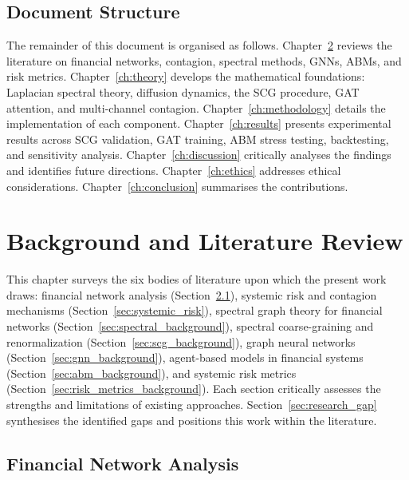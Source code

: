 \section{Document Structure}
\label{sec:structure}

The remainder of this document is organised as follows. Chapter~\ref{ch:background} reviews the literature on financial networks, contagion, spectral methods, GNNs, ABMs, and risk metrics. Chapter~\ref{ch:theory} develops the mathematical foundations: Laplacian spectral theory, diffusion dynamics, the SCG procedure, GAT attention, and multi-channel contagion. Chapter~\ref{ch:methodology} details the implementation of each component. Chapter~\ref{ch:results} presents experimental results across SCG validation, GAT training, ABM stress testing, backtesting, and sensitivity analysis. Chapter~\ref{ch:discussion} critically analyses the findings and identifies future directions. Chapter~\ref{ch:ethics} addresses ethical considerations. Chapter~\ref{ch:conclusion} summarises the contributions.


\chapter{Background and Literature Review}
\label{ch:background}

This chapter surveys the six bodies of literature upon which the present
work draws: financial network analysis (Section~\ref{sec:fin_networks}),
systemic risk and contagion mechanisms
(Section~\ref{sec:systemic_risk}), spectral graph theory for financial
networks (Section~\ref{sec:spectral_background}), spectral
coarse-graining and renormalization (Section~\ref{sec:scg_background}),
graph neural networks (Section~\ref{sec:gnn_background}), agent-based
models in financial systems (Section~\ref{sec:abm_background}), and
systemic risk metrics (Section~\ref{sec:risk_metrics_background}).  Each
section critically assesses the strengths and limitations of existing
approaches.  Section~\ref{sec:research_gap} synthesises the identified
gaps and positions this work within the literature.


\section{Financial Network Analysis}
\label{sec:fin_networks}

